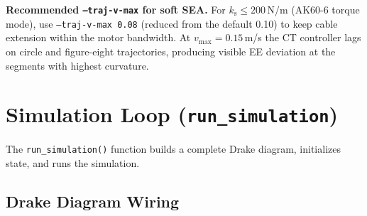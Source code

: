 \documentclass[11pt,a4paper]{article}
\newcommand{\ks}{k_{\mathrm{s}}}
\begin{document}
\begin{resultbox}
\textbf{Recommended \texttt{--traj-v-max} for soft SEA.}
For $\ks \leq 200$\,N/m (AK60-6 torque mode), use \texttt{--traj-v-max 0.08}
(reduced from the default 0.10) to keep cable extension within the motor
bandwidth.  At $v_{\max} = 0.15$\,m/s the CT controller lags on circle and
figure-eight trajectories, producing visible EE deviation at the segments
with highest curvature.
\end{resultbox}


\section{Simulation Loop (\texttt{run\_simulation})}
\label{sec:sim_loop}

The \texttt{run\_simulation()} function builds a complete Drake diagram, initializes state, and runs the simulation.

\subsection{Drake Diagram Wiring}
\end{document}

